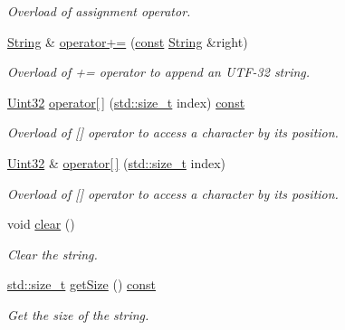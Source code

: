 \begin{DoxyCompactItemize}
\begin{DoxyCompactList}\small\item\em Overload of assignment operator. \end{DoxyCompactList}\item 
\hyperlink{classsf_1_1_string}{String} \& \hyperlink{classsf_1_1_string_ae6563ce2c243ae2160eea8a354199f4e}{operator+=} (\hyperlink{term__entry_8h_a57bd63ce7f9a353488880e3de6692d5a}{const} \hyperlink{classsf_1_1_string}{String} \&right)
\begin{DoxyCompactList}\small\item\em Overload of += operator to append an U\-T\-F-\/32 string. \end{DoxyCompactList}\item 
\hyperlink{namespacesf_aa746fb1ddef4410bddf198ebb27e727c}{Uint32} \hyperlink{classsf_1_1_string_a649b89a65866bf03652f7b5cb6de3bb6}{operator\mbox{[}$\,$\mbox{]}} (\hyperlink{nc__alloc_8h_a7b60c5629e55e8ec87a4547dd4abced4}{std\-::size\-\_\-t} index) \hyperlink{term__entry_8h_a57bd63ce7f9a353488880e3de6692d5a}{const} 
\begin{DoxyCompactList}\small\item\em Overload of \mbox{[}\mbox{]} operator to access a character by its position. \end{DoxyCompactList}\item 
\hyperlink{namespacesf_aa746fb1ddef4410bddf198ebb27e727c}{Uint32} \& \hyperlink{classsf_1_1_string_abc989da7f4fb873ab29188d40772ab24}{operator\mbox{[}$\,$\mbox{]}} (\hyperlink{nc__alloc_8h_a7b60c5629e55e8ec87a4547dd4abced4}{std\-::size\-\_\-t} index)
\begin{DoxyCompactList}\small\item\em Overload of \mbox{[}\mbox{]} operator to access a character by its position. \end{DoxyCompactList}\item 
void \hyperlink{classsf_1_1_string_a391c1b4950cbf3d3f8040cea73af2969}{clear} ()
\begin{DoxyCompactList}\small\item\em Clear the string. \end{DoxyCompactList}\item 
\hyperlink{nc__alloc_8h_a7b60c5629e55e8ec87a4547dd4abced4}{std\-::size\-\_\-t} \hyperlink{classsf_1_1_string_a635d75c4cd830d5f639a41815dd0ce23}{get\-Size} () \hyperlink{term__entry_8h_a57bd63ce7f9a353488880e3de6692d5a}{const} 
\begin{DoxyCompactList}\small\item\em Get the size of the string. \end{DoxyCompactList}\item 

\end{DoxyCompactItemize}
